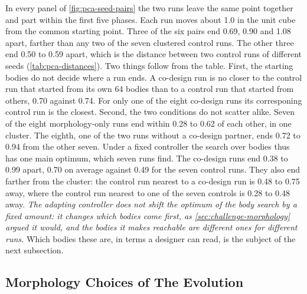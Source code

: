 In every panel of \autoref{fig:pca-seed-pairs} the two runs leave the same point together and part within the first five phases. Each run moves about 1.0 in the unit cube from the common starting point. Three of the six pairs end 0.69, 0.90 and 1.08 apart, farther than any two of the seven clustered control runs. The other three end 0.50 to 0.59 apart, which is the distance between two control runs of different seeds (\autoref{tab:pca-distances}). Two things follow from the table. First, the starting bodies do not decide where a run ends. A co-design run is no closer to the control run that started from its own 64 bodies than to a control run that started from others, 0.70 against 0.74. For only one of the eight co-design runs its corresponing control run is the closest. Second, the two conditions do not scatter alike. Seven of the eight morphology-only runs end within 0.28 to 0.62 of each other, in one cluster. The eighth, one of the two runs without a co-design partner, ends 0.72 to 0.94 from the other seven. Under a fixed controller the search over bodies thus has one main optimum, which seven runs find. The co-design runs end 0.38 to 0.99 apart, 0.70 on average against 0.49 for the seven control runs. They also end farther from the cluster: the control run nearest to a co-design run is 0.48 to 0.75 away, where the control run nearest to one of the seven controls is 0.28 to 0.48 away. \emph{The adapting controller does not shift the optimum of the body search by a fixed amount: it changes which bodies come first, as \autoref{sec:challenge-morphology} argued it would, and the bodies it makes reachable are different ones for different runs.} Which bodies these are, in terms a designer can read, is the subject of the next subsection.

\subsection{Morphology Choices of The Evolution}
\label{subsec:results-morphologies}

